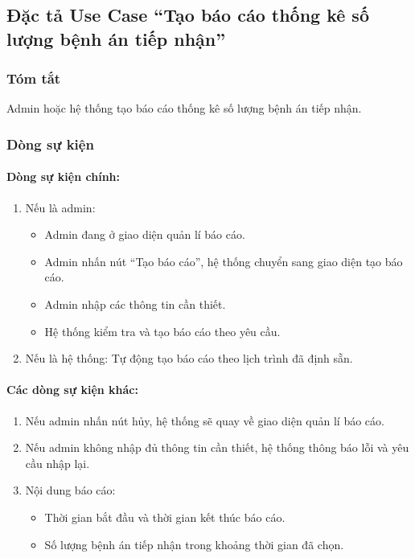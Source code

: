 \subsection{Đặc tả Use Case ``Tạo báo cáo thống kê số lượng bệnh án tiếp nhận''}

\subsubsection{Tóm tắt}
Admin hoặc hệ thống tạo báo cáo thống kê số lượng bệnh án tiếp nhận.

\subsubsection{Dòng sự kiện}
\paragraph{\textbf{Dòng sự kiện chính:}}
\begin{enumerate}
  \item Nếu là admin:
  \begin{itemize}
    \item Admin đang ở giao diện quản lí báo cáo.
    \item Admin nhấn nút ``Tạo báo cáo'', hệ thống chuyển sang giao diện tạo báo cáo.
    \item Admin nhập các thông tin cần thiết.
    \item Hệ thống kiểm tra và tạo báo cáo theo yêu cầu.
  \end{itemize}
  \item Nếu là hệ thống: Tự động tạo báo cáo theo lịch trình đã định sẵn.
\end{enumerate}

\paragraph{\textbf{Các dòng sự kiện khác:}}
\begin{enumerate}
  \item Nếu admin nhấn nút hủy, hệ thống sẽ quay về giao diện quản lí báo cáo.
  \item Nếu admin không nhập đủ thông tin cần thiết, hệ thống thông báo lỗi và yêu cầu nhập lại.
  \item Nội dung báo cáo:
  \begin{itemize}
    \item Thời gian bắt đầu và thời gian kết thúc báo cáo.
    \item Số lượng bệnh án tiếp nhận trong khoảng thời gian đã chọn.
  \end{itemize}
\end{enumerate}


